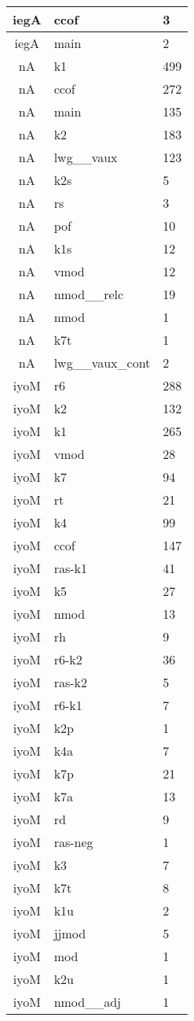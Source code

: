 \documentclass[a4 paper]{article}
\begin{document}
\begin{longtable}{cp{}p{}}
iegA & ccof & 3\\ \midrule iegA & main & 2\\ \midrule 
nA & k1 & 499\\ \midrule nA & ccof & 272\\ \midrule nA & main & 135\\ \midrule nA & k2 & 183\\ \midrule nA & lwg\_\_vaux & 123\\ \midrule nA & k2s & 5\\ \midrule nA & rs & 3\\ \midrule nA & pof & 10\\ \midrule nA & k1s & 12\\ \midrule nA & vmod & 12\\ \midrule nA & nmod\_\_relc & 19\\ \midrule nA & nmod & 1\\ \midrule nA & k7t & 1\\ \midrule nA & lwg\_\_vaux\_cont & 2\\ \midrule 
iyoM & r6 & 288\\ \midrule iyoM & k2 & 132\\ \midrule iyoM & k1 & 265\\ \midrule iyoM & vmod & 28\\ \midrule iyoM & k7 & 94\\ \midrule iyoM & rt & 21\\ \midrule iyoM & k4 & 99\\ \midrule iyoM & ccof & 147\\ \midrule iyoM & ras-k1 & 41\\ \midrule iyoM & k5 & 27\\ \midrule iyoM & nmod & 13\\ \midrule iyoM & rh & 9\\ \midrule iyoM & r6-k2 & 36\\ \midrule iyoM & ras-k2 & 5\\ \midrule iyoM & r6-k1 & 7\\ \midrule iyoM & k2p & 1\\ \midrule iyoM & k4a & 7\\ \midrule iyoM & k7p & 21\\ \midrule iyoM & k7a & 13\\ \midrule iyoM & rd & 9\\ \midrule iyoM & ras-neg & 1\\ \midrule iyoM & k3 & 7\\ \midrule iyoM & k7t & 8\\ \midrule iyoM & k1u & 2\\ \midrule iyoM & jjmod & 5\\ \midrule iyoM & mod & 1\\ \midrule iyoM & k2u & 1\\ \midrule iyoM & nmod\_\_adj & 1\\ \midrule 

\end{longtable}
\end{document}
